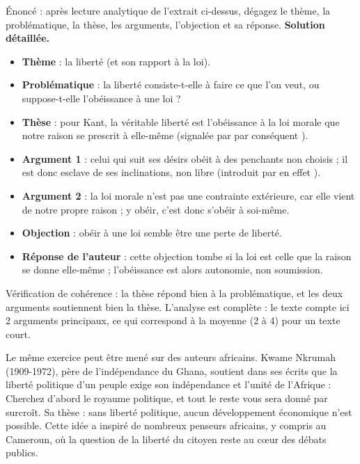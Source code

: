 \documentclass[11pt]{article}
\begin{document}
\begin{exoresolu}
Énoncé : après lecture analytique de l'extrait ci-dessus, dégagez le thème, la problématique, la thèse, les arguments, l'objection et sa réponse.
\tcblower
\textbf{Solution détaillée.}
\begin{itemize}
\item \textbf{Thème} : la liberté (et son rapport à la loi).
\item \textbf{Problématique} : la liberté consiste-t-elle à faire ce que l'on veut, ou suppose-t-elle l'obéissance à une loi ?
\item \textbf{Thèse} : pour Kant, la véritable liberté est l'obéissance à la loi morale que notre raison se prescrit à elle-même (signalée par \og par conséquent \fg{}).
\item \textbf{Argument 1} : celui qui suit ses désirs obéit à des penchants non choisis ; il est donc esclave de ses inclinations, non libre (introduit par \og en effet \fg{}).
\item \textbf{Argument 2} : la loi morale n'est pas une contrainte extérieure, car elle vient de notre propre raison ; y obéir, c'est donc s'obéir à soi-même.
\item \textbf{Objection} : obéir à une loi semble être une perte de liberté.
\item \textbf{Réponse de l'auteur} : cette objection tombe si la loi est celle que la raison se donne elle-même ; l'obéissance est alors autonomie, non soumission.
\end{itemize}
Vérification de cohérence : la thèse répond bien à la problématique, et les deux arguments soutiennent bien la thèse. L'analyse est complète : le texte compte ici 2 arguments principaux, ce qui correspond à la moyenne (2 à 4) pour un texte court.
\end{exoresolu}

\begin{savaistu}
Le même exercice peut être mené sur des auteurs africains. Kwame Nkrumah (1909-1972), père de l'indépendance du Ghana, soutient dans ses écrits que la liberté politique d'un peuple exige son indépendance et l'unité de l'Afrique : \og Cherchez d'abord le royaume politique, et tout le reste vous sera donné par surcroît. \fg{} Sa thèse : sans liberté politique, aucun développement économique n'est possible. Cette idée a inspiré de nombreux penseurs africains, y compris au Cameroun, où la question de la liberté du citoyen reste au cœur des débats publics.
\end{savaistu}
\end{document}
